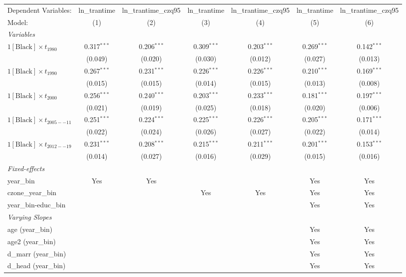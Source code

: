 \begin{tabular}{lcccccc}
\tabularnewline\midrule\midrule
Dependent Variables:&ln\_trantime&ln\_trantime\_czq95&ln\_trantime&ln\_trantime\_czq95&ln\_trantime&ln\_trantime\_czq95\\
Model:&(1) & (2) & (3) & (4) & (5) & (6)\\
\midrule \emph{Variables}&   &   &   &   &   &  \\
$1[\text{Black}] \times t_{1980}$ & 0.317$^{***}$ & 0.206$^{***}$ & 0.309$^{***}$ & 0.203$^{***}$ & 0.269$^{***}$ & 0.142$^{***}$\\
  &(0.049) & (0.020) & (0.030) & (0.012) & (0.027) & (0.013)\\
$1[\text{Black}] \times t_{1990}$ & 0.267$^{***}$ & 0.231$^{***}$ & 0.226$^{***}$ & 0.226$^{***}$ & 0.210$^{***}$ & 0.169$^{***}$\\
  &(0.015) & (0.015) & (0.014) & (0.015) & (0.013) & (0.008)\\
$1[\text{Black}] \times t_{2000}$ & 0.256$^{***}$ & 0.240$^{***}$ & 0.203$^{***}$ & 0.233$^{***}$ & 0.181$^{***}$ & 0.197$^{***}$\\
  &(0.021) & (0.019) & (0.025) & (0.018) & (0.020) & (0.006)\\
$1[\text{Black}] \times t_{2005--11}$ & 0.251$^{***}$ & 0.224$^{***}$ & 0.225$^{***}$ & 0.226$^{***}$ & 0.205$^{***}$ & 0.171$^{***}$\\
  &(0.022) & (0.024) & (0.026) & (0.027) & (0.022) & (0.014)\\
$1[\text{Black}] \times t_{2012--19}$ & 0.231$^{***}$ & 0.208$^{***}$ & 0.215$^{***}$ & 0.211$^{***}$ & 0.201$^{***}$ & 0.153$^{***}$\\
  &(0.014) & (0.027) & (0.016) & (0.029) & (0.015) & (0.016)\\
\midrule \emph{Fixed-effects}&   &   &   &   &   &  \\
year\_bin & Yes & Yes &  &  & Yes & Yes\\
czone\_year\_bin &  &  & Yes & Yes & Yes & Yes\\
year\_bin-educ\_bin &  &  &  &  & Yes & Yes\\
\midrule \emph{Varying Slopes}&   &   &   &   &   &  \\
age (year\_bin) &  &  &  &  & Yes & Yes\\
age2 (year\_bin) &  &  &  &  & Yes & Yes\\
d\_marr (year\_bin) &  &  &  &  & Yes & Yes\\
d\_head (year\_bin) &  &  &  &  & Yes & Yes\\

\end{tabular}
